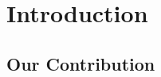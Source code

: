 \documentclass[twocolumn]{bmcart}%
\begin{document}
\begin{frontmatter}
\begin{fmbox}
\begin{abstractbox}
\begin{keyword}
\end{keyword}


\end{abstractbox}
%
\end{fmbox}%

\end{frontmatter}





\section{Introduction}


%

\subsection{Our Contribution}

\end{document}
